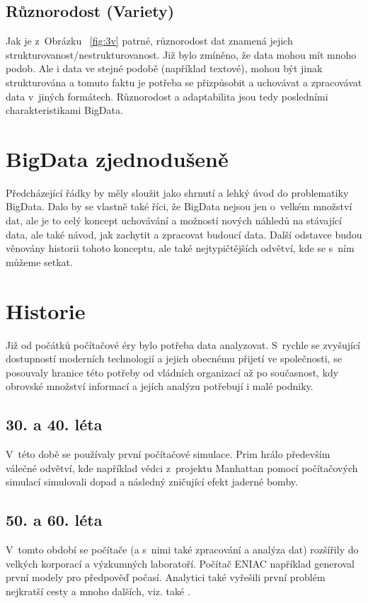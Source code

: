 \subsection{Různorodost (Variety)}
Jak je z~Obrázku ~\ref{fig:3v} patrné, různorodost dat znamená jejich strukturovanost/nestrukturovanost. Již bylo zmíněno, že data mohou mít mnoho podob. Ale i data ve stejné podobě (například textové), mohou být jinak strukturována a tomuto faktu je potřeba se přizpůsobit a uchovávat a zpracovávat data v~jiných formátech. %
Různorodost a adaptabilita jsou tedy posledními charakteristikami BigData.

\section{BigData zjednodušeně}
Předcházející řádky by měly sloužit jako shrnutí a lehký úvod do problematiky BigData. Dalo by se vlastně také říci, že BigData nejsou jen o~velkém množství dat, ale je to celý koncept uchovávání a možností nových náhledů na stávající data, ale také návod, jak zachytit a zpracovat budoucí data. Další odstavce budou věnovány historii tohoto konceptu, ale také nejtypičtějších odvětví, kde se s~ním můžeme setkat. 

\section{Historie}

Již od počátků počítačové éry bylo potřeba data analyzovat. \cite{history} S~rychle se zvyšující dostupností moderních technologií a jejich obecnému přijetí ve společnosti, se posouvaly hranice této potřeby od vládních organizací až po současnost, kdy obrovské množství informací a jejích analýzu potřebují i malé podniky.

\subsection{30. a 40. léta}
V~této době se používaly první počítačové simulace. Prim hrálo především válečné odvětví, kde například vědci z~projektu Manhattan pomocí počítačových simulací simulovali dopad a následný zničující efekt jaderné bomby.

\subsection{50. a 60. léta}
V~tomto období se počítače (a s~nimi také zpracování a analýza dat) rozšířily do velkých korporací a výzkumných laboratoří. Počítač ENIAC například generoval první modely pro předpověď počasí. Analytici také vyřešili první problém nejkratší cesty a mnoho dalších, viz. také \cite{history}.

